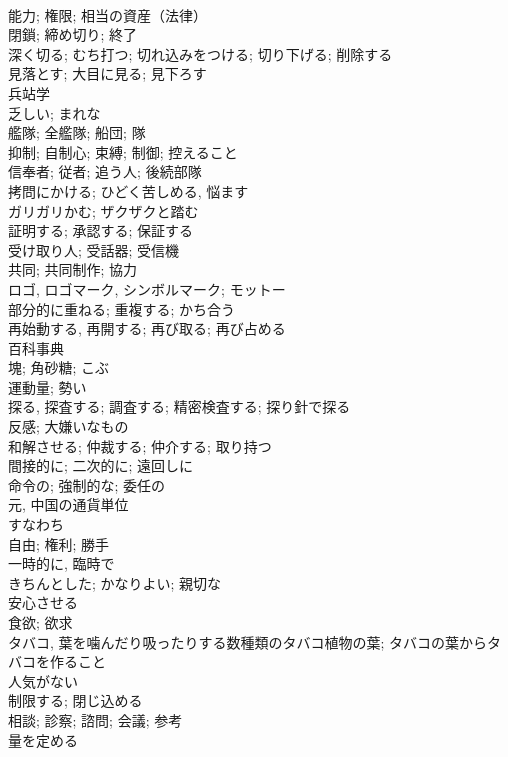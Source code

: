 \documentclass[8pt]{extreport}
\begin{document}
\begin{CJK}{UTF8}{min}
\\	能力; 権限; 相当の資産（法律）	
\\	閉鎖; 締め切り; 終了	
\\	深く切る; むち打つ; 切れ込みをつける; 切り下げる; 削除する	
\\	見落とす; 大目に見る; 見下ろす	
\\	兵站学	
\\	乏しい; まれな	
\\	艦隊; 全艦隊; 船団; 隊	
\\	抑制; 自制心; 束縛; 制御; 控えること	
\\	信奉者; 従者; 追う人; 後続部隊	
\\	拷問にかける; ひどく苦しめる, 悩ます	
\\	ガリガリかむ; ザクザクと踏む	
\\	証明する; 承認する; 保証する	
\\	受け取り人; 受話器; 受信機	
\\	共同; 共同制作; 協力	
\\	ロゴ, ロゴマーク, シンボルマーク; モットー	
\\	部分的に重ねる; 重複する; かち合う	
\\	再始動する, 再開する; 再び取る; 再び占める	
\\	百科事典	
\\	塊; 角砂糖; こぶ	
\\	運動量; 勢い	
\\	探る, 探査する; 調査する; 精密検査する; 探り針で探る	
\\	反感; 大嫌いなもの	
\\	和解させる; 仲裁する; 仲介する; 取り持つ	
\\	間接的に; 二次的に; 遠回しに	
\\	命令の; 強制的な; 委任の	
\\	元, 中国の通貨単位	
\\	すなわち	
\\	自由; 権利; 勝手	
\\	一時的に, 臨時で	
\\	きちんとした; かなりよい; 親切な	
\\	安心させる	
\\	食欲; 欲求	
\\	タバコ, 葉を噛んだり吸ったりする数種類のタバコ植物の葉; タバコの葉からタバコを作ること	
\\	人気がない	
\\	制限する; 閉じ込める	
\\	相談; 診察; 諮問; 会議; 参考	
\\	量を定める	

\end{CJK}
\end{document}
